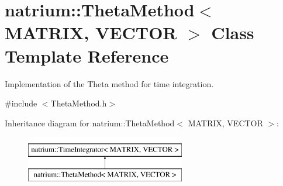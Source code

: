 \hypertarget{classnatrium_1_1ThetaMethod}{\section{natrium\-:\-:Theta\-Method$<$ M\-A\-T\-R\-I\-X, V\-E\-C\-T\-O\-R $>$ Class Template Reference}
\label{classnatrium_1_1ThetaMethod}
}


Implementation of the Theta method for time integration.  




{\ttfamily \#include $<$Theta\-Method.\-h$>$}

Inheritance diagram for natrium\-:\-:Theta\-Method$<$ M\-A\-T\-R\-I\-X, V\-E\-C\-T\-O\-R $>$\-:\begin{figure}[H]
\begin{center}
\leavevmode
\includegraphics[height=2.000000cm]{classnatrium_1_1ThetaMethod}
\end{center}
\end{figure}
